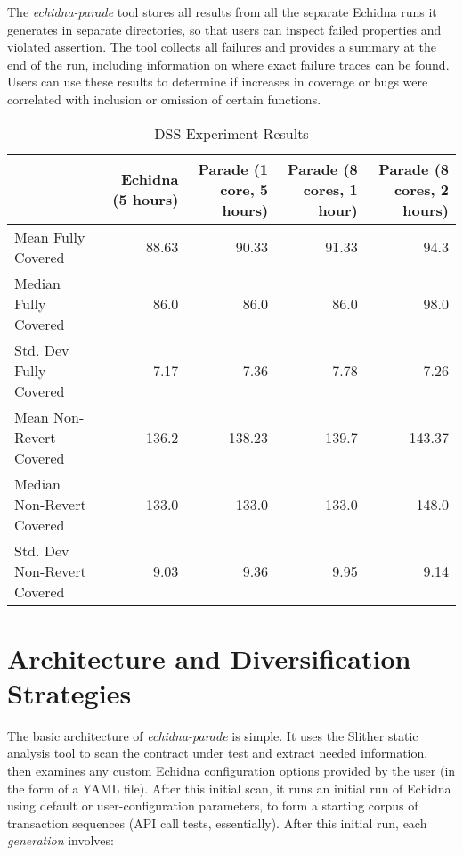 \documentclass[sigconf,screen]{acmart}
\begin{document}
{The \emph{echidna-parade} tool stores all results from all the separate Echidna runs it generates in separate directories, so that users can inspect failed properties and violated assertion.  The tool collects all failures and provides a summary at the end of the run, including information on where exact failure traces can be found.  Users can use these results to determine if increases in coverage or bugs were correlated with inclusion or omission of certain functions.

\begin{table*}
\centering
\begin{tabular}{l|r|r|r|r}
& Echidna (5 hours) & Parade (1 core, 5 hours) & Parade (8 cores, 1
                                                 hour) & Parade (8
                                                         cores, 2
                                                         hours) \\
  \hline
  Mean Fully Covered & 88.63 & 90.33 & 91.33 & 94.3 \\
  Median Fully Covered & 86.0 & 86.0 & 86.0 & 98.0 \\
  Std. Dev Fully Covered & 7.17 & 7.36 & 7.78 & 7.26 \\
  \hline
  Mean Non-Revert Covered & 136.2 & 138.23 & 139.7 & 143.37 \\
  Median Non-Revert Covered & 133.0 & 133.0 & 133.0 & 148.0 \\
  Std. Dev Non-Revert Covered & 9.03 & 9.36 & 9.95 & 9.14 \\                         
\end{tabular}
\caption{DSS Experiment Results}
\label{tab:exp}
\end{table*}


\section{Architecture and Diversification Strategies}

The basic architecture of \emph{echidna-parade} is simple.  It uses
the Slither static analysis tool to scan the contract under test and
extract needed information, then examines any custom Echidna
configuration options provided by the user (in the form of a YAML
file).  After this initial scan, it runs an initial run of Echidna
using default or user-configuration parameters, to form a starting
corpus of transaction sequences (API call tests, essentially).  After
this initial run, each \emph{generation} involves:

}
\end{document}
